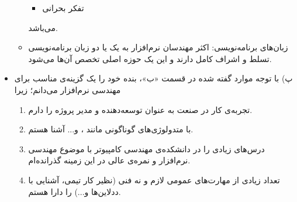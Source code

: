 \begin{itemize}
\begin{itemize}
\begin{itemize}
			\item تفکر بحرانی
		\end{itemize}
	می‌باشد.
	\item 
	زبان‌های برنامه‌نویسی: اکثر مهندسان نرم‌افزار به یک یا دو زبان برنامه‌نویسی تسلط و اشراف کامل دارند و این یک حوزه اصلی تخصص آن‌ها می‌شود. 
	\end{itemize}
\item 
پ) با توجه موارد گفته شده در قسمت «ب»، بنده خود را یک گزینه‌ی مناسب برای مهندسی نرم‌افزار می‌دانم؛ زیرا 
	\begin{enumerate}
		\item تجربه‌ی کار در صنعت به عنوان توسعه‌دهنده و مدیر پروژه را دارم.
		\item با متدولوژی‌های گوناگونی مانند ،  و... آشنا هستم.
		\item درس‌های زیادی را در دانشکده‌ی مهندسی کامپیوتر با موضوع مهندسی نرم‌افزار و نمره‌ی عالی در این زمینه گذرانده‌ام.
		\item تعداد زیادی از مهارت‌های عمومی لازم و نه فنی (نظیر کار تیمی، آشنایی با ددلاین‌ها و...) را دارا هستم.
	\end{enumerate}
\end{itemize}